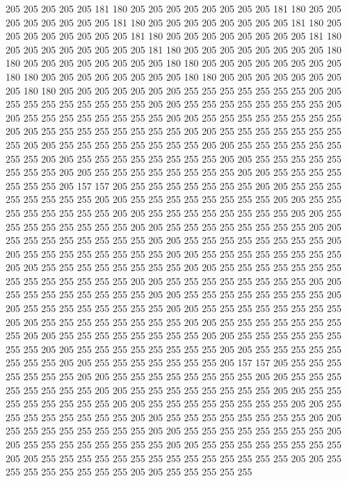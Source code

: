 205 205 205 205 205 181 180 205 205 205 205 205 205 205 205 181 180 205 205 205
205 205 205 205 205 181 180 205 205 205 205 205 205 205 205 181 180 205 205 205
205 205 205 205 205 181 180 205 205 205 205 205 205 205 205 181 180 205 205 205
205 205 205 205 205 181 180 205 205 205 205 205 205 205 205 180 180 205 205 205
205 205 205 205 205 180 180 205 205 205 205 205 205 205 205 180 180 205 205 205
205 205 205 205 205 180 180 205 205 205 205 205 205 205 205 180 180 205 205 205
205 205 205 205 255 255 255 255 255 255 255 205 205 255 255 255 255 255 255 255
255 205 205 255 255 255 255 255 255 255 255 205 205 255 255 255 255 255 255 255
255 205 205 255 255 255 255 255 255 255 255 205 205 255 255 255 255 255 255 255
255 205 205 255 255 255 255 255 255 255 255 205 205 255 255 255 255 255 255 255
255 205 205 255 255 255 255 255 255 255 255 205 205 255 255 255 255 255 255 255
255 205 205 255 255 255 255 255 255 255 255 205 205 255 255 255 255 255 255 255
255 205 205 255 255 255 255 255 255 255 205 157 157 205 255 255 255 255 255 255
255 205 205 255 255 255 255 255 255 255 255 205 205 255 255 255 255 255 255 255
255 205 205 255 255 255 255 255 255 255 255 205 205 255 255 255 255 255 255 255
255 205 205 255 255 255 255 255 255 255 255 205 205 255 255 255 255 255 255 255
255 205 205 255 255 255 255 255 255 255 255 205 205 255 255 255 255 255 255 255
255 205 205 255 255 255 255 255 255 255 255 205 205 255 255 255 255 255 255 255
255 205 205 255 255 255 255 255 255 255 255 205 205 255 255 255 255 255 255 255
255 255 255 255 255 255 255 205 205 255 255 255 255 255 255 255 255 205 205 255
255 255 255 255 255 255 255 205 205 255 255 255 255 255 255 255 255 205 205 255
255 255 255 255 255 255 255 205 205 255 255 255 255 255 255 255 255 205 205 255
255 255 255 255 255 255 255 205 205 255 255 255 255 255 255 255 255 205 205 255
255 255 255 255 255 255 255 205 205 255 255 255 255 255 255 255 255 205 205 255
255 255 255 255 255 255 255 205 205 255 255 255 255 255 255 255 255 205 205 255
255 255 255 255 255 255 205 157 157 205 255 255 255 255 255 255 255 205 205 255
255 255 255 255 255 255 255 205 205 255 255 255 255 255 255 255 255 205 205 255
255 255 255 255 255 255 255 205 205 255 255 255 255 255 255 255 255 205 205 255
255 255 255 255 255 255 255 205 205 255 255 255 255 255 255 255 255 205 205 255
255 255 255 255 255 255 255 205 205 255 255 255 255 255 255 255 255 205 205 255
255 255 255 255 255 255 255 205 205 255 255 255 255 255 255 255 255 205 205 255
255 255 255 255 255 255 255 205 205 255 255 255 255 255 255 255 255 255 255 255
255 255 255 205 205 255 255 255 255 255 255 255 255 205 205 255 255 255 255 255
